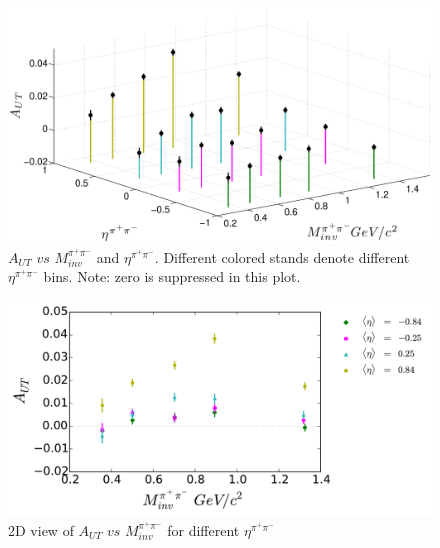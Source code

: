 \documentclass[letterpaper, abstract = on,listof=totoc, bibliography=totoc]{scrreprt}
\newcommand{\ptpair}{P_{T}^{\pi^+\pi^-}}
\newcommand{\mpair}{M_{inv}^{\pi^+\pi^-}}
\newcommand{\etapair}{\eta^{\pi^+\pi^-}}
\begin{document}



\begin{figure}
\begin{center}
\includegraphics[width = 1\textwidth]{massEta3d82415}
\caption[Asymmetry $vs$ $\etapair$ and $\mpair$ 2D binning]{$A_{UT}$ $vs$ $\mpair$ and $\etapair$. Different colored stands denote different $\etapair$ bins. Note: zero is suppressed in this plot.}
\label{fig:3dmassEta}
\end{center}
\end{figure}

\begin{figure}
\begin{center}
\includegraphics[width = 1\textwidth]{Asym2dProjMassEta82415_difMark5}
\caption[2D view of $A_{UT}$ $vs$ $\mpair$ for different $\etapair$]{2D view of $A_{UT}$ $vs$ $\mpair$ for different $\etapair$}
\label{fig:2dMassEta}
\end{center}
\end{figure}
\end{document}
